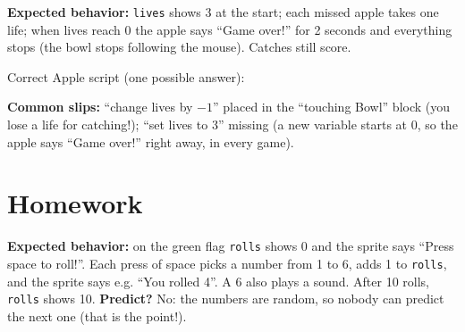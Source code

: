 \begin{answer}
\textbf{Expected behavior:} \texttt{lives} shows 3 at the start; each missed apple takes one life; when lives reach 0 the apple says \enquote{Game over!} for 2 seconds and everything stops (the bowl stops following the mouse). Catches still score.

Correct Apple script (one possible answer):
\begin{center}
\begin{scratch}[scale=0.72]
\end{scratch}
\end{center}
\textbf{Common slips:} \enquote{change lives by $-1$} placed in the \enquote{touching Bowl} block (you lose a life for catching!); \enquote{set lives to 3} missing (a new variable starts at 0, so the apple says \enquote{Game over!} right away, in every game).
\end{answer}

\section{Homework}
\begin{answer}
\textbf{Expected behavior:} on the green flag \texttt{rolls} shows 0 and the sprite says \enquote{Press space to roll!}. Each press of space picks a number from 1 to 6, adds 1 to \texttt{rolls}, and the sprite says e.g. \enquote{You rolled 4}. A 6 also plays a sound. After 10 rolls, \texttt{rolls} shows 10.
\textbf{Predict?} No: the numbers are random, so nobody can predict the next one (that is the point!).
\end{answer}

